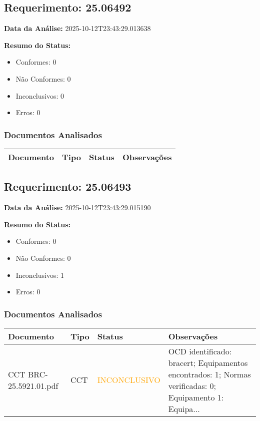 \documentclass[12pt,a4paper]{article}
\begin{document}
\subsection{Requerimento: 25.06492}

\textbf{Data da Análise:} 2025-10-12T23:43:29.013638

\textbf{Resumo do Status:}
\begin{itemize}
    \item Conformes: 0
    \item Não Conformes: 0
    \item Inconclusivos: 0
    \item Erros: 0
\end{itemize}

\subsubsection{Documentos Analisados}

\begin{longtable}{|p{4cm}|p{2cm}|p{2cm}|p{6cm}|}
\hline
\textbf{Documento} & \textbf{Tipo} & \textbf{Status} & \textbf{Observações} \\
\hline
\endhead
\end{longtable}


\subsection{Requerimento: 25.06493}

\textbf{Data da Análise:} 2025-10-12T23:43:29.015190

\textbf{Resumo do Status:}
\begin{itemize}
    \item Conformes: 0
    \item Não Conformes: 0
    \item Inconclusivos: 1
    \item Erros: 0
\end{itemize}

\subsubsection{Documentos Analisados}

\begin{longtable}{|p{4cm}|p{2cm}|p{2cm}|p{6cm}|}
\hline
\textbf{Documento} & \textbf{Tipo} & \textbf{Status} & \textbf{Observações} \\
\hline
\endhead
CCT BRC-25.5921.01.pdf & CCT & \textcolor{orange}{INCONCLUSIVO} & OCD identificado: bracert; Equipamentos encontrados: 1; Normas verificadas: 0; Equipamento 1: Equipa... \\
\hline
\end{longtable}
\end{document}
